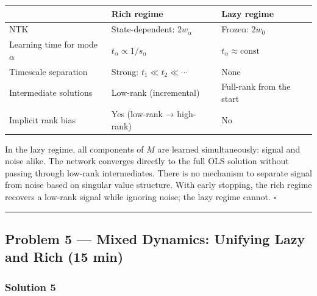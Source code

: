 \documentclass[
]{article}
\newcounter{none} %
\begin{document}
{\def\LTcaptype{none} %
\begin{longtable}[]{@{}
  >{\raggedright\arraybackslash}p{}
  >{\raggedright\arraybackslash}p{}
  >{\raggedright\arraybackslash}p{}@{}}
\toprule\noalign{}
\begin{minipage}[b]{\linewidth}\raggedright
\end{minipage} & \begin{minipage}[b]{\linewidth}\raggedright
Rich regime
\end{minipage} & \begin{minipage}[b]{\linewidth}\raggedright
Lazy regime
\end{minipage} \\
\midrule\noalign{}
\endhead
\bottomrule\noalign{}
\endlastfoot
NTK & State-dependent: \(2w_\alpha\) & Frozen: \(2w_0\) \\
Learning time for mode \(\alpha\) & \(t_\alpha \propto 1/s_\alpha\) &
\(t_\alpha \approx \text{const}\) \\
Timescale separation & Strong: \(t_1 \ll t_2 \ll \cdots\) & None \\
Intermediate solutions & Low-rank (incremental) & Full-rank from the
start \\
Implicit rank bias & Yes (low-rank → high-rank) & No \\
\end{longtable}
}

In the lazy regime, all components of \(M\) are learned simultaneously:
signal and noise alike. The network converges directly to the full OLS
solution without passing through low-rank intermediates. There is no
mechanism to separate signal from noise based on singular value
structure. With early stopping, the rich regime recovers a low-rank
signal while ignoring noise; the lazy regime cannot. \(\square\)

\begin{center}\rule{0.5\linewidth}{0.5pt}\end{center}

\subsection{Problem 5 --- Mixed Dynamics: Unifying Lazy and Rich (15
min)}\label{problem-5-mixed-dynamics-unifying-lazy-and-rich-15-min}

\subsubsection{Solution 5}\label{solution-5}
\end{document}
